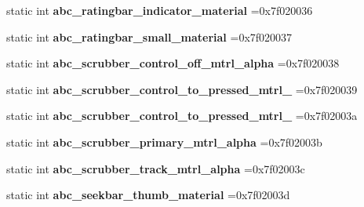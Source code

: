 \begin{DoxyCompactItemize}
\mbox{\label{classandroid_1_1support_1_1v4_1_1R_1_1drawable_a18c9ceb4fb05969951f023a8bbe04b71}} 
static int {\bfseries abc\+\_\+ratingbar\+\_\+indicator\+\_\+material} =0x7f020036
\item 
\mbox{\label{classandroid_1_1support_1_1v4_1_1R_1_1drawable_a5c80cae91aa53322d5b88a0acd7f2213}} 
static int {\bfseries abc\+\_\+ratingbar\+\_\+small\+\_\+material} =0x7f020037
\item 
\mbox{\label{classandroid_1_1support_1_1v4_1_1R_1_1drawable_a6c0dcb425f8b9d23cfc4e578d0f451e9}} 
static int {\bfseries abc\+\_\+scrubber\+\_\+control\+\_\+off\+\_\+mtrl\+\_\+alpha} =0x7f020038
\item 
\mbox{\label{classandroid_1_1support_1_1v4_1_1R_1_1drawable_a900a814e70ee6d9dd9670f1b9010786d}} 
static int {\bfseries abc\+\_\+scrubber\+\_\+control\+\_\+to\+\_\+pressed\+\_\+mtrl\+\_} =0x7f020039
\item 
\mbox{\label{classandroid_1_1support_1_1v4_1_1R_1_1drawable_a066d964851a76bd56979f212bf287fed}} 
static int {\bfseries abc\+\_\+scrubber\+\_\+control\+\_\+to\+\_\+pressed\+\_\+mtrl\+\_} =0x7f02003a
\item 
\mbox{\label{classandroid_1_1support_1_1v4_1_1R_1_1drawable_a68f028f72393045c84271e4fc7552f55}} 
static int {\bfseries abc\+\_\+scrubber\+\_\+primary\+\_\+mtrl\+\_\+alpha} =0x7f02003b
\item 
\mbox{\label{classandroid_1_1support_1_1v4_1_1R_1_1drawable_a10ac37308f4cd6e8b09cad754bee88d3}} 
static int {\bfseries abc\+\_\+scrubber\+\_\+track\+\_\+mtrl\+\_\+alpha} =0x7f02003c
\item 
\mbox{\label{classandroid_1_1support_1_1v4_1_1R_1_1drawable_a79a324d6d0c731fdcb6bca8c7024cbcc}} 
static int {\bfseries abc\+\_\+seekbar\+\_\+thumb\+\_\+material} =0x7f02003d
\item 

\end{DoxyCompactItemize}
